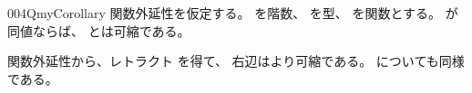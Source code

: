 \documentclass[index]{subfiles}
\begin{document}
\begin{myBlock}{004Q}{myCorollary}
  関数外延性を仮定する。
  を階数、
  を型、
  を関数とする。
  が同値ならば、
  とは可縮である。
\end{myBlock}
\begin{myProof}
  関数外延性から、レトラクト
  を得て、
  右辺はより可縮である。
  についても同様である。
\end{myProof}
\end{document}
